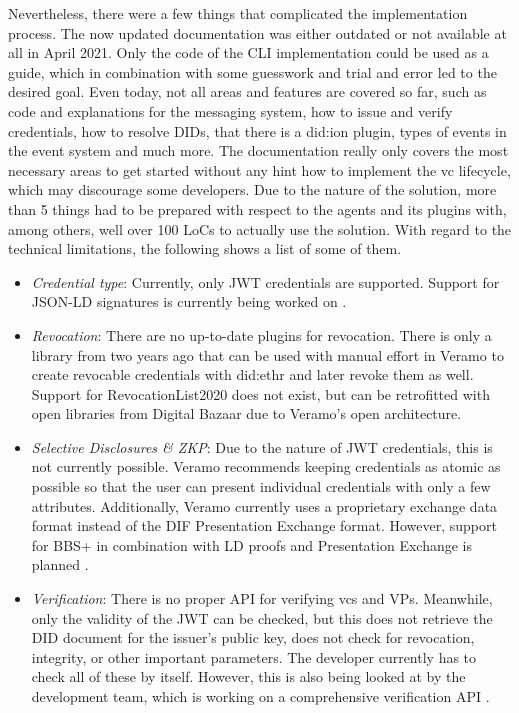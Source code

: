         Nevertheless, there were a few things that complicated the implementation process. The now updated documentation was either outdated or not available at all in April 2021. Only the code of the \ac{CLI} implementation could be used as a guide, which in combination with some guesswork and trial and error led to the desired goal. Even today, not all areas and features are covered so far, such as code and explanations for the messaging system, how to issue and verify credentials, how to resolve \acp{DID}, that there is a did:ion plugin, types of events in the event system and much more. The documentation really only covers the most necessary areas to get started without any hint how to implement the \ac{vc} lifecycle, which may discourage some developers. Due to the nature of the solution, more than 5 things had to be prepared with respect to the agents and its plugins with, among others, well over 100 LoCs to actually use the solution. With regard to the technical limitations, the following shows a list of some of them.
    
\begin{itemize}
    \item \textit{Credential type}: Currently, only JWT credentials are supported. Support for JSON-LD signatures is currently being worked on \cite{terbu_tracking_2021}.
    \item \textit{Revocation}: There are no up-to-date plugins for revocation. There is only a library from two years ago that can be used with manual effort in Veramo to create revocable credentials with did:ethr and later revoke them as well. Support for RevocationList2020 does not exist, but can be retrofitted with open libraries from Digital Bazaar due to Veramo's open architecture.
    \item \textit{Selective Disclosures \& \ac{ZKP}}: Due to the nature of JWT credentials, this is not currently possible. Veramo recommends keeping credentials as atomic as possible so that the user can present individual credentials with only a few attributes. Additionally, Veramo currently uses a proprietary exchange data format instead of the DIF Presentation Exchange format. However, support for BBS+ in combination with LD proofs and Presentation Exchange is planned \cite{terbu_tracking_2021}.
    \item \textit{Verification}: There is no proper API for verifying \acp{vc} and \acp{VP}. Meanwhile, only the validity of the JWT can be checked, but this does not retrieve the \ac{DID} document for the issuer's public key, does not check for revocation, integrity, or other important parameters. The developer currently has to check all of these by itself. However, this is also being looked at by the development team, which is working on a comprehensive verification API \cite{riedel_generalized_2021}.
\end{itemize}

